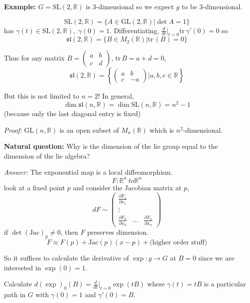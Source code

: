 \documentclass[12pt]{article}
\newcommand{\R}{\mathbb{R}}
\newcommand{\SL}{\text{SL}}
\newcommand{\GL}{\text{GL}}
\newcommand{\tr}{\text{tr}\,}
\renewcommand{\sl}{\mathfrak{sl}}
\newenvironment*{tbox}[2][gray]{
    \begin{tcolorbox}[
        parbox=false,
        colback=#1!5!white,
        colframe=#1!75!black,
        breakable,
        title={#2}
    ]}
    {\end{tcolorbox}}
\begin{document}
    \textbf{Example:} $G = \SL(2, \R)$ is 3-dimensional so we expect $g$ to be 3-dimensional. 

    \[\SL(2, \R) = \{A \in \GL(2, \R) \big\vert \det A = 1\}\] 
    has $\gamma(t) \in \SL(2, \R), \; \gamma(0) = 1$. Differentiating, $\frac{d}{dt}\bigg\vert_{t=0} \tr \gamma'(0) = 0$ so 
    \[\sl(2, \R) = \{B \in M_2(\R)\big\vert \tr(B) = 0\}\]

    Thus for any matrix $B = \begin{pmatrix}
        a & b\\ 
        c & d
    \end{pmatrix}$, $\tr B = a + d = 0$, 
    \[\sl(2, \R) = \left\{\begin{pmatrix}
        a & b\\ 
        c & -a
    \end{pmatrix} \bigg\vert a, b, c \in \R\right\}\]  

    But this is not limited to $n=2$! In general, 
    \[\dim \sl(n, \R) = \dim \SL(n, \R) = n^2 - 1\]
    (because only the last diagonal entry is fixed)

    \begin{tbox}{ \emph{Claim:} $\dim \GL(n, \R) = n^2$}
        \emph{Proof:} $\GL(n, \R)$ is an open subset of $M_n(\R)$ which is $n^2$-dimensional.
    \end{tbox}

    \textbf{Natural question:} Why is the dimension of the lie group equal to the dimension of the lie algebra?
    
    \emph{Answer:} The exponential map is a local diffeomorphism. 
    \[F: \R^n\ to \R^n\]
    look at a fixed point $p$ and consider the Jacobian matrix at $p$, 
    \[dF \sim \begin{pmatrix}
        \frac{\partial F_1}{\partial x_1}\\ 
        \vdots\\
        \frac{\partial F_n}{\partial x_n} & \dots & \frac{\partial F_n}{\partial x_n}
    \end{pmatrix}\] 
    if $\det(\text{Jac})_p \neq 0$, then $F$ preserves dimension. 
    \[F \approx F(p) + \text{Jac}(p)(x - p) + \text{(higher order stuff)}\]

    So it suffices to calculate the derivative of $\exp: g \to G$ at $B = 0$ since we are interested in $\exp(0) = 1$.

    Calculate $d(\exp)_0(B) = \frac{d}{dt}\bigg\vert_{t=0} \exp(tB)$ where $\gamma(t) = tB$ is a particular path in $G$ with $\gamma(0) = 1$ and $\gamma'(0) = B$. 
\end{document}
